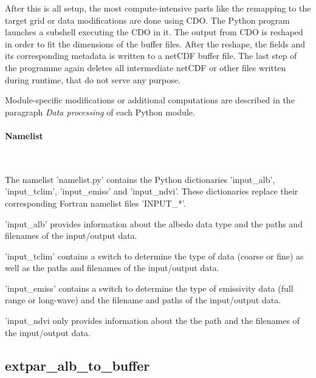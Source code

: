 \documentclass[a4paper,10pt,DIV14,BCOR1cm,titlepage,twoside]{scrartcl}
\begin{document}
\noindent After this is all setup, the most compute-intensive parts like the remapping to the target grid or data modifications are done using CDO. The Python program launches a subshell executing the CDO in it.
The output from CDO is reshaped in order to fit the dimensions of the buffer files. After the reshape, the fields and its corresponding metadata is written to a netCDF buffer file. The last step of the programme again deletes all intermediate netCDF or other files written during runtime, that do not serve any purpose.

\noindent Module-specific modifications or additional computations are described in the paragraph \textit{Data processing} of each Python module.
\paragraph{Namelist}\ \par\medskip\noindent
\noindent The namelist 'namelist.py' contains the Python dictionaries 'input\_alb', 'input\_tclim', 'input\_emiss' and 'input\_ndvi'. These dictionaries replace their corresponding Fortran namelist files 'INPUT\_*'.

\noindent 'input\_alb' provides information about the albedo data type and the paths and filenames of the input/output data.

\noindent'input\_tclim' contains a switch to determine the type of data (coarse or fine) as well as the paths and filenames of the input/output data.

\noindent'input\_emiss' contains a switch to determine the type of emissivity data (full range or long-wave) and the filename and paths of the input/output data.

\noindent'input\_ndvi only provides information about the the path and the filenames of the input/output data.

\subsection{extpar\_alb\_to\_buffer}\label{extpar_alb_to_buffer}
\end{document}
